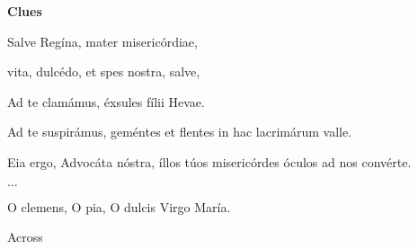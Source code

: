 \documentclass[12pt]{article}
\begin{document}
\hskip 2cm\begin{minipage}[t]{9cm}
\begin{center}

\large \textbf{Clues}

Salve Regína, mater misericórdiae,

vita, dulcédo, et spes nostra, salve,

Ad te clamámus, éxsules fílii Hevae.

Ad te suspirámus, geméntes et flentes in hac lacrimárum valle.

Eia ergo, Advocáta nóstra, 
 íllos túos misericórdes óculos 
 ad nos convérte.

$\ldots$

O clemens, O pia, O dulcis Virgo María.

\end{center}
\end{minipage}\hskip2cm\begin{minipage}[t]{5cm}
\noindent Across 


\end{minipage}
\end{document}
